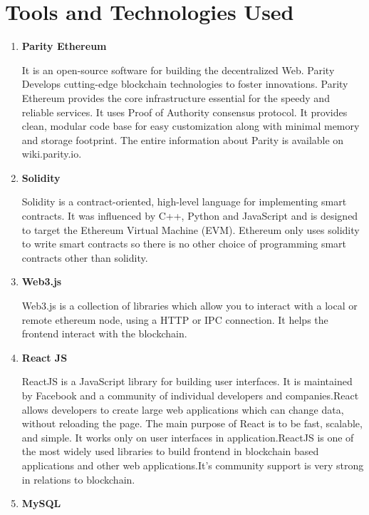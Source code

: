 \section{Tools and Technologies Used}
\begin{enumerate}
	\item \textbf{Parity Ethereum}
	      	      
	      It is an open-source software for building the decentralized Web. Parity Develops cutting-edge blockchain technologies to foster innovations. Parity Ethereum provides the core infrastructure essential for the speedy and reliable services. It uses Proof of
	      Authority consensus protocol. It provides clean, modular code base for easy customization along with minimal memory and storage footprint. The entire information about Parity is available on wiki.parity.io. 
	      	               
	\item \textbf{Solidity}
	      	      
	      Solidity is a contract-oriented, high-level language for implementing smart contracts. It was influenced by C++, Python and JavaScript and is designed to target the Ethereum Virtual Machine (EVM). Ethereum only uses solidity to write smart contracts so there is no other choice of programming smart contracts other than solidity.
	      	      
	\item \textbf{Web3.js}
	      	      
	      Web3.js is a collection of libraries which allow you to interact with a local or remote ethereum node, using a HTTP or IPC connection. It helps the frontend interact with the blockchain.
	      	      
	\item  \textbf{React JS}
	
	      ReactJS is a JavaScript library for building user interfaces. It is maintained by Facebook and a community of individual developers and companies.React allows developers to create large web applications which can change data, without reloading the page. The main purpose of React is to be fast, scalable, and simple. It works only on user interfaces in application.ReactJS is one of the most widely used libraries to build frontend in blockchain based applications and other web applications.It’s community support is very strong in relations to blockchain.
	      \clearpage
	\item   \textbf{MySQL}
	

\end{enumerate}
